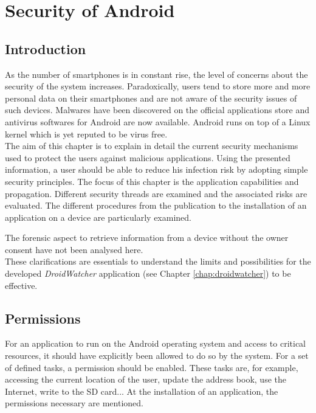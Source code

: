 \chapter{Security of Android}
\label{chap:and-secu}

\section*{Introduction}
As the number of smartphones is in constant rise, the level of concerns about the security of the system increases.
Paradoxically, users tend to store more and more personal data on their smartphones and are not aware of the security issues of such devices.
Malwares have been discovered on the official applications store and antivirus softwares for Android are now available.
Android runs on top of a Linux kernel which is yet reputed to be virus free.\\

The aim of this chapter is to explain in detail the current security mechanisms used to protect the users against malicious applications.
Using the presented information, a user should be able to reduce his infection risk by adopting simple security principles.
The focus of this chapter is the application capabilities and propagation.
Different security threads are examined and the associated risks are evaluated.
The different procedures from the publication to the installation of an application on a device are particularly examined.

The forensic aspect to retrieve information from a device without the owner consent have not been analysed here.\\

These clarifications are essentials to understand the limits and possibilities for the developed \emph{DroidWatcher} application (see Chapter \ref{chap:droidwatcher}) to be effective.

\section{Permissions}
\label{sec:permissions}

For an application to run on the Android operating system and access to critical resources, it should have explicitly been allowed to do so by the system. %
For a set of defined tasks, a permission should be enabled.
These tasks are, for example, accessing the current location of the user, update the address book, use the Internet, write to the SD card...
At the installation of an application, the permissions necessary are mentioned.\\

